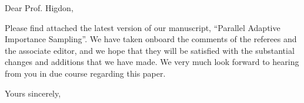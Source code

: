 \documentclass{letter}
\begin{document}
\date{}
\begin{letter}{ }

\opening{Dear Prof. Higdon,}

Please find attached the latest version of our manuscript, ``Parallel Adaptive Importance Sampling''. We have taken onboard the comments of the referees and the associate editor, and we hope that they will be satisfied with the substantial changes and additions that we have made. We very much look forward to hearing from you in due course regarding this paper.

\closing{Yours sincerely,}
\end{letter}
\end{document}

